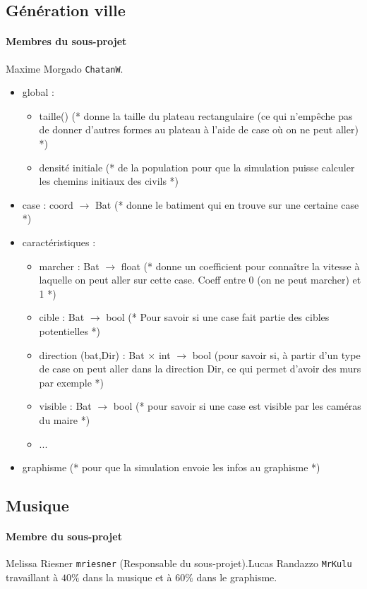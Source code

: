 \documentclass[a4paper,10pt]{article}
\begin{document}
\subsection{Génération ville}
\paragraph{Membres du sous-projet} Maxime Morgado \verb!ChatanW!.

\begin{itemize}
\item global : \begin{itemize}
  \item taille() (* donne la taille du plateau rectangulaire (ce qui n'empêche pas de donner d'autres formes au plateau à l'aide de case où on ne peut aller) *)
  \item densité initiale (* de la population pour que la simulation puisse calculer les chemins initiaux des civils *)
  \end{itemize}
\item case : coord $ \rightarrow$ Bat (* donne le batiment qui en trouve sur une certaine case *)
\item caractéristiques : \begin{itemize}
  \item marcher : Bat $ \rightarrow$ float (* donne un coefficient pour connaître la vitesse à laquelle on peut aller sur cette case. Coeff entre 0 (on ne peut marcher) et 1 *)
  \item cible : Bat $ \rightarrow$ bool (* Pour savoir si une case fait partie des cibles potentielles *)
  \item direction (bat,Dir) : Bat $\times$ int $ \rightarrow$ bool (pour savoir si, à partir d'un type de case on peut aller dans la direction Dir, ce qui permet d'avoir des murs par exemple *)
  \item visible : Bat $ \rightarrow$ bool (* pour savoir si une case est visible par les caméras du maire *)
  \item ...
  \end{itemize}
\item graphisme (* pour que la simulation envoie les infos au graphisme *)
\end{itemize}


\subsection{Musique} 
\paragraph{Membre du sous-projet} Melissa Riesner \verb!mriesner! (Responsable du sous-projet).Lucas Randazzo \verb!MrKulu! travaillant à $40\%$ dans la musique et à $60\%$ dans le graphisme. 
\end{document}
